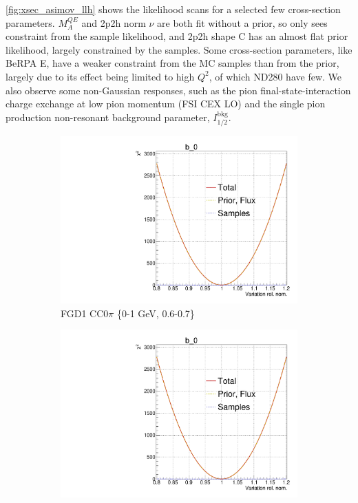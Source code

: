 \autoref{fig:xsec_asimov_llh} shows the likelihood scans for a selected few cross-section parameters. $M_A^{QE}$ and 2p2h norm $\nu$ are both fit without a prior, so only sees constraint from the sample likelihood, and 2p2h shape C has an almost flat prior likelihood, largely constrained by the samples. Some cross-section parameters, like BeRPA E, have a weaker constraint from the MC samples than from the prior, largely due to its effect being limited to high $Q^2$, of which ND280 have few. We also observe some non-Gaussian responses, such as the pion final-state-interaction charge exchange at low pion momentum (FSI CEX LO) and the single pion production non-resonant background parameter, $I_{1/2}^\text{bkg}$.
\begin{figure}[!h]
	\centering
	\begin{subfigure}[t]{0.32\textwidth}
		\includegraphics[width=\textwidth, trim={0mm 0mm 0mm 11mm}, clip,page=132]{figures/mach3/Asimov/Full_LLHscan_18July_BeRPA_U_ND280logL_scan}
		\caption{FGD1 CC0$\pi$ 	\{0-1 GeV, 0.6-0.7\}}
	\end{subfigure}
	\begin{subfigure}[t]{0.32\textwidth}
		\includegraphics[width=\textwidth, trim={0mm 0mm 0mm 11mm}, clip,page=239]{figures/mach3/Asimov/Full_LLHscan_18July_BeRPA_U_ND280logL_scan}

\end{subfigure}
\end{figure}
